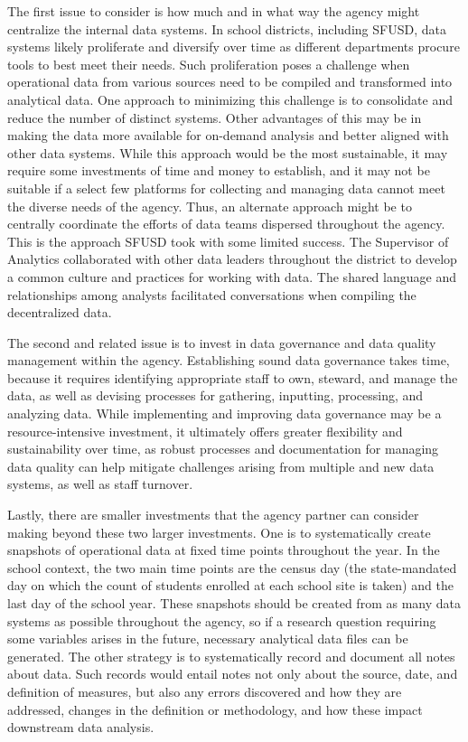 The first issue to consider is how much and in what way the agency might centralize the internal data systems. In school districts, including SFUSD, data systems likely proliferate and diversify over time as different departments procure tools to best meet their needs. Such proliferation poses a challenge when operational data from various sources need to be compiled and transformed into analytical data. One approach to minimizing this challenge is to consolidate and reduce the number of distinct systems. Other advantages of this may be in making the data more available for on-demand analysis and better aligned with other data systems. While this approach would be the most sustainable, it may require some investments of time and money to establish, and it may not be suitable if a select few platforms for collecting and managing data cannot meet the diverse needs of the agency. Thus, an alternate approach might be to centrally coordinate the efforts of data teams dispersed throughout the agency. This is the approach SFUSD took with some limited success. The Supervisor of Analytics collaborated with other data leaders throughout the district to develop a common culture and practices for working with data. The shared language and relationships among analysts facilitated conversations when compiling the decentralized data.

The second and related issue is to invest in data governance and data quality management within the agency. Establishing sound data governance takes time, because it requires identifying appropriate staff to own, steward, and manage the data, as well as devising processes for gathering, inputting, processing, and analyzing data. While implementing and improving data governance may be a resource-intensive investment, it ultimately offers greater flexibility and sustainability over time, as robust processes and documentation for managing data quality can help mitigate challenges arising from multiple and new data systems, as well as staff turnover.

Lastly, there are smaller investments that the agency partner can consider making beyond these two larger investments. One is to systematically create snapshots of operational data at fixed time points throughout the year. In the school context, the two main time points are the census day (the state-mandated day on which the count of students enrolled at each school site is taken) and the last day of the school year. These snapshots should be created from as many data systems as possible throughout the agency, so if a research question requiring some variables arises in the future, necessary analytical data files can be generated. The other strategy is to systematically record and document all notes about data. Such records would entail notes not only about the source, date, and definition of measures, but also any errors discovered and how they are addressed, changes in the definition or methodology, and how these impact downstream data analysis.

